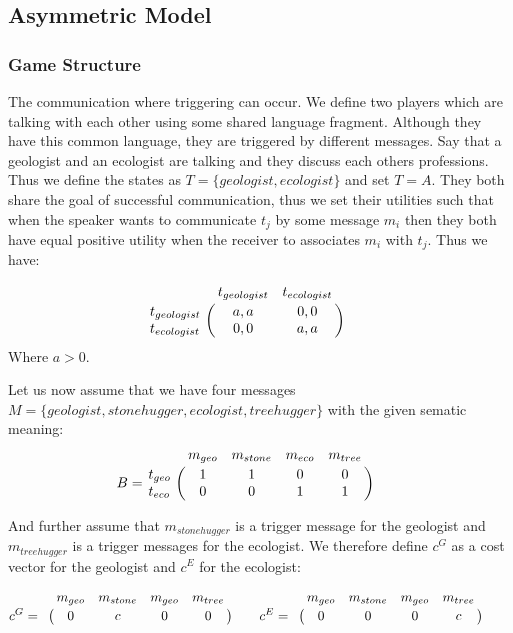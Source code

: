 \documentclass[10]{article}
\begin{document}
\subsection{Asymmetric Model}
\subsubsection{Game Structure}
The  communication where triggering can occur. We define two players which are talking with each other using some shared language fragment. Although they have this common language, they are triggered by different messages. Say that a geologist and an ecologist are talking and they discuss each others professions. Thus we define the states as $T=\{geologist, ecologist\}$ and set $T=A$. They both share the goal of successful communication, thus we set their utilities such that when the speaker wants to communicate $t_{j}$ by some message $m_i$ then they both have equal positive utility when the receiver to associates $m_i$ with $t_{j}$. Thus we have:

\begin{equation*}
\bordermatrix{
      & t_{geologist} & t_{ecologist}    \cr
  t_{geologist} & a,a & 0,0  \cr
  t_{ecologist} & 0,0 & a,a
}\qquad
\end{equation*}
Where $a>0$.

Let us now assume that we have four messages $M=\{geologist, stonehugger, ecologist, treehugger\}$ with the given sematic meaning:
 \begin{equation*}
 B =
 \bordermatrix{
            & m_{geo} & m_{stone} & m_{eco} & m_{tree}    \cr
   t_{geo}  &       1 &         1 & 0       & 0 \cr
   t_{eco}  &       0 &         0 & 1       & 1
 }\qquad
 \end{equation*}

 And further assume that $m_{stonehugger}$ is a trigger message for the geologist and $m_{treehugger}$ is a trigger messages for the ecologist. We therefore define $c^G$ as a cost vector for the geologist and $c^E$ for the ecologist:

  \begin{equation*}
  c^G =
  \bordermatrix{
             & m_{geo} & m_{stone} & m_{geo} & m_{tree}    \cr
             &       0 &         c & 0       & 0
  }\qquad
  c^E =
    \bordermatrix{
               & m_{geo} & m_{stone} & m_{geo} & m_{tree}    \cr
               &       0 &         0 & 0       & c
    }\qquad
  \end{equation*}
\end{document}
